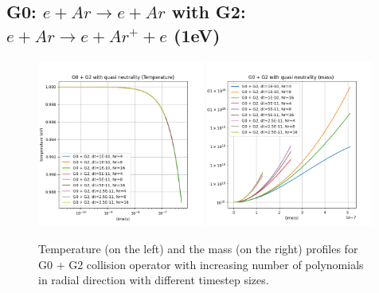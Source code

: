 \documentclass{article}
\begin{document}
\subsection{G0: $e + Ar \rightarrow e + Ar $  with  G2: $e + Ar \rightarrow e + Ar^+ + e $ (1eV)}
\begin{figure}[H]
    \centering
    \includegraphics[width=0.49\textwidth]{dat/g012_temp_1ev.png}
    \includegraphics[width=0.49\textwidth]{dat/g012_mass_1ev.png}
    \caption{Temperature (on the left) and the mass (on the right) profiles for G0 + G2 collision operator with increasing number of polynomials in radial direction with different timestep sizes. }
\end{figure}
\end{document}
